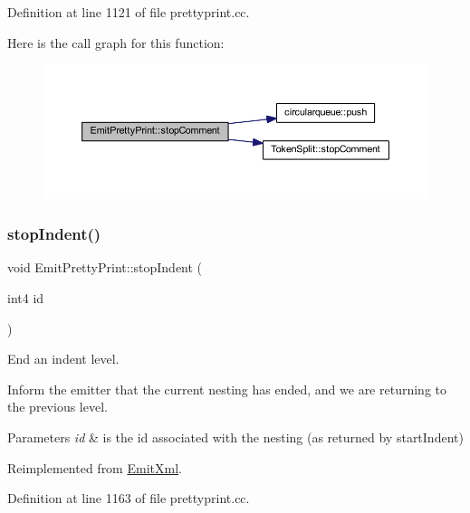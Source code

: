Definition at line 1121 of file prettyprint.\+cc.

Here is the call graph for this function\+:
\nopagebreak
\begin{figure}[H]
\begin{center}
\leavevmode
\includegraphics[width=350pt]{class_emit_pretty_print_ad87969dcd6426529f85890b8ed6bb687_cgraph}
\end{center}
\end{figure}
\mbox{\label{class_emit_pretty_print_a9804f4ea2076b47333f02697b23e77f2}} 
\subsubsection{\texorpdfstring{stopIndent()}{stopIndent()}}
{\footnotesize\ttfamily void Emit\+Pretty\+Print\+::stop\+Indent (\begin{DoxyParamCaption}\item[{int4}]{id }\end{DoxyParamCaption})\hspace{0.3cm}{\ttfamily [virtual]}}



End an indent level. 

Inform the emitter that the current nesting has ended, and we are returning to the previous level. 
\begin{DoxyParams}{Parameters}
{\em id} & is the id associated with the nesting (as returned by start\+Indent) \\
\hline
\end{DoxyParams}


Reimplemented from \mbox{\hyperlink{class_emit_xml_a87ee3be19fea009ca1191a252a7c91ce}{Emit\+Xml}}.



Definition at line 1163 of file prettyprint.\+cc.

